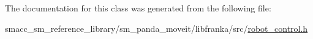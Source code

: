 The documentation for this class was generated from the following file\+:\begin{DoxyCompactItemize}
\item 
smacc\+\_\+sm\+\_\+reference\+\_\+library/sm\+\_\+panda\+\_\+moveit/libfranka/src/\hyperlink{robot__control_8h}{robot\+\_\+control.\+h}\end{DoxyCompactItemize}

